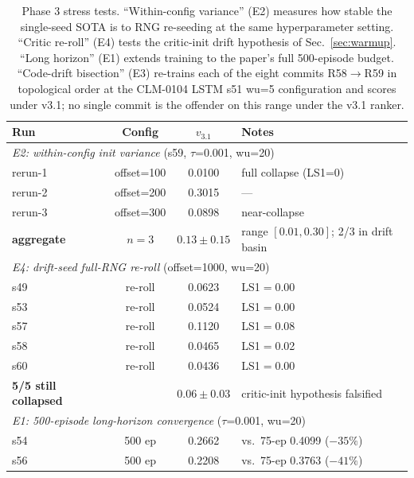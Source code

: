 \documentclass[journal,onecolumn,11pt]{IEEEtran}
\begin{document}
\begin{table}[!t]
  \centering
  \caption{Phase 3 stress tests. ``Within-config variance'' (E2)
  measures how stable the single-seed SOTA is to RNG re-seeding at
  the same hyperparameter setting. ``Critic re-roll'' (E4) tests
  the critic-init drift hypothesis of Sec.~\ref{sec:warmup}.
  ``Long horizon'' (E1) extends training to the paper's full
  500-episode budget. ``Code-drift bisection'' (E3) re-trains each
  of the eight commits R58$\rightarrow$R59 in topological order at
  the CLM-0104 LSTM s51 wu=5 configuration and scores under v3.1;
  no single commit is the offender on this range under the v3.1
  ranker.}
  \label{tab:phase3}
  \scriptsize
  \begin{tabular}{lccl}
    \toprule
    Run                & Config      & $v_{3.1}$ & Notes \\
    \midrule
    \multicolumn{4}{l}{\emph{E2: within-config init variance}
      (s59, $\tau$=0.001, wu=20)} \\
    rerun-1            & offset=100  & 0.0100 & full collapse (LS1=0) \\
    rerun-2            & offset=200  & 0.3015 & --- \\
    rerun-3            & offset=300  & 0.0898 & near-collapse \\
    \textbf{aggregate} & $n=3$       & \textbf{$0.13 \pm 0.15$} & range $[0.01, 0.30]$; 2/3 in drift basin \\
    \midrule
    \multicolumn{4}{l}{\emph{E4: drift-seed full-RNG re-roll}
      (offset=1000, wu=20)} \\
    s49 & re-roll      & 0.0623 & LS1$=$0.00 \\
    s53 & re-roll      & 0.0524 & LS1$=$0.00 \\
    s57 & re-roll      & 0.1120 & LS1$=$0.08 \\
    s58 & re-roll      & 0.0465 & LS1$=$0.02 \\
    s60 & re-roll      & 0.0436 & LS1$=$0.00 \\
    \textbf{5/5 still collapsed} & & \textbf{$0.06 \pm 0.03$} & critic-init hypothesis falsified \\
    \midrule
    \multicolumn{4}{l}{\emph{E1: 500-episode long-horizon convergence}
      ($\tau$=0.001, wu=20)} \\
    s54 & 500 ep       & 0.2662 & vs.\ 75-ep 0.4099 (\textbf{$-35\%$}) \\
    s56 & 500 ep       & 0.2208 & vs.\ 75-ep 0.3763 (\textbf{$-41\%$}) \\

\end{tabular}
\end{table}
\end{document}
